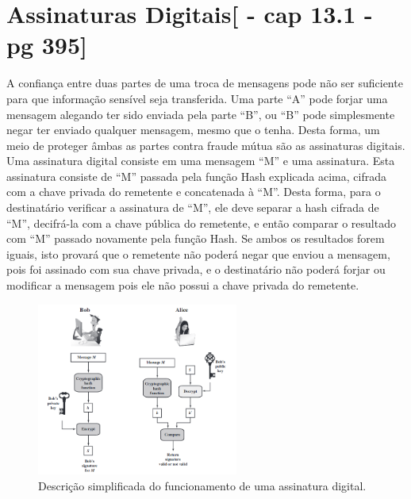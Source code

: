 \documentclass{article}
\begin{document}
	\section{Assinaturas Digitais[\cite{STALLINS} - cap 13.1 - pg 395]}
		\begin{flushleft}
			\begin{large}

			\hspace{2cm}A confiança entre duas partes de uma troca de mensagens pode não ser suficiente para que informação sensível seja transferida. Uma parte “A” pode forjar uma mensagem alegando ter sido enviada pela parte “B”, ou “B” pode simplesmente negar ter enviado qualquer mensagem, mesmo que o tenha. Desta forma, um meio de proteger âmbas as partes contra fraude mútua são as assinaturas digitais.
    Uma assinatura digital consiste em uma mensagem “M” e uma assinatura. Esta assinatura consiste de “M” passada pela função Hash explicada acima, cifrada com a chave privada do remetente e concatenada à “M”. Desta forma, para o destinatário verificar a assinatura de “M”, ele deve separar a hash cifrada de “M”, decifrá-la com a chave pública do remetente, e então comparar o resultado com “M” passado novamente pela função Hash. Se ambos os resultados forem iguais, isto provará que o remetente não poderá negar que enviou a mensagem, pois foi assinado com sua chave privada, e o destinatário não poderá forjar ou modificar a mensagem pois ele não possui a chave privada do remetente.
			
			\end{large}
		\end{flushleft}


	\begin{figure}[hb!]
		\centering
		\includegraphics[width=250px]{AssinaturaDigital.png}
		\caption{Descrição simplificada do funcionamento de uma assinatura digital.}
		\label{fig:digiSign}

	\end{figure}
\end{document}
